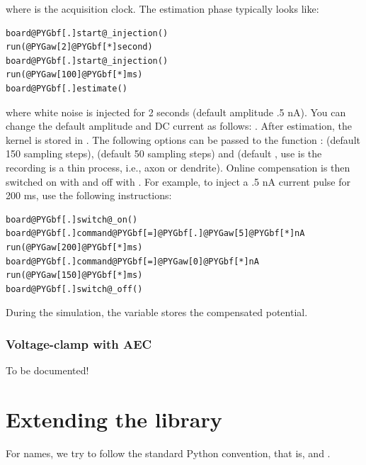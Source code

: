 \documentclass[letterpaper,10pt,english]{manual}
\begin{document}
where  is the acquisition clock. The estimation phase typically looks like:

\begin{Verbatim}[commandchars=@\[\]]
board@PYGbf[.]start@_injection()
run(@PYGaw[2]@PYGbf[*]second)
board@PYGbf[.]start@_injection()
run(@PYGaw[100]@PYGbf[*]ms)
board@PYGbf[.]estimate()
\end{Verbatim}

where white noise is injected for 2 seconds (default amplitude .5 nA).
You can change the default amplitude and DC current as follows:
.
After estimation, the kernel is stored in .
The following options can be passed to the function :
 (default 150 sampling steps),  (default 50 sampling steps)
and  (default , use  is the recording is a thin
process, i.e., axon or dendrite).
Online compensation is then switched on with 
and off with . For example, to inject a .5 nA current
pulse for 200 ms, use the following instructions:

\begin{Verbatim}[commandchars=@\[\]]
board@PYGbf[.]switch@_on()
board@PYGbf[.]command@PYGbf[=]@PYGbf[.]@PYGaw[5]@PYGbf[*]nA
run(@PYGaw[200]@PYGbf[*]ms)
board@PYGbf[.]command@PYGbf[=]@PYGaw[0]@PYGbf[*]nA
run(@PYGaw[150]@PYGbf[*]ms)
board@PYGbf[.]switch@_off()
\end{Verbatim}

During the simulation, the variable  stores the compensated
potential.


\subsubsection{Voltage-clamp with AEC}

To be documented!

\resetcurrentobjects
\hypertarget{--doc-extendinglibrary}{}

\section{Extending the library}

For names, we try to follow the standard Python convention, that is, 
and .

\resetcurrentobjects
\hypertarget{--doc-advanced}{}
\end{document}
